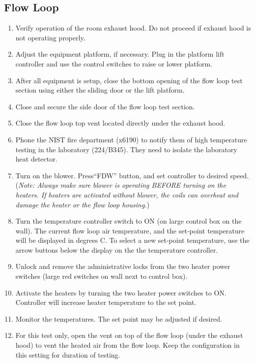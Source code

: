 \documentclass[12pt,oneside]{book}
\begin{document}
\subsection{Flow Loop}
\label{proc_flowloop}
\begin{enumerate}
  \item Verify operation of the room exhaust hood. Do not proceed if exhaust hood is not operating properly.
  \item Adjust the equipment platform, if necessary. Plug in the platform lift controller and use the control switches to raise or lower platform. 
  \item After all equipment is setup, close the bottom opening of the flow loop test section using either the sliding door or the lift platform.  
  \item Close and secure the side door of the flow loop test section.
  \item Close the flow loop top vent located directly under the exhaust hood.
  \item  Phone the NIST fire department (x6190) to notify them of high temperature testing in the laboratory (224/B345). They need to isolate the laboratory heat detector.
  \item Turn on the blower.  Press``FDW'' button, and set controller to desired speed. ({\em Note: Always make sure blower is operating BEFORE turning on the heaters.  If heaters are activated without blower, the coils can overheat and damage the heater or the flow loop housing.})
  \item Turn the temperature controller switch to ON (on large control box on the wall). The current flow loop air temperature, and the set-point temperature will be displayed in degrees C. To select a new set-point temperature, use the arrow buttons below the display on the the temperature controller.  
  \item Unlock and remove the administrative locks from the two heater power switches (large red switches on wall next to control box).  
  \item Activate the heaters by turning the two heater power switches to ON. Controller will increase heater temperature to the set point. 
  \item Monitor the temperatures. The set point may be adjusted if desired.
  \item For this test only, open the vent on top of the flow loop (under the exhaust hood) to vent the heated air from the flow loop. Keep the configuration in this setting for duration of testing.

\end{enumerate}
\end{document}
